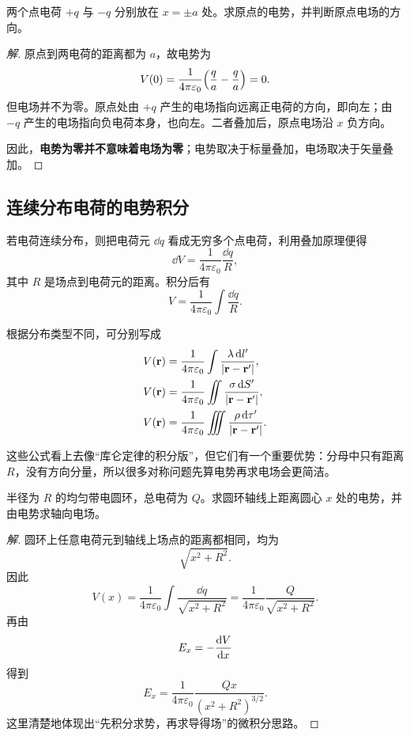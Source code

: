 \begin{example}
两个点电荷 $+q$ 与 $-q$ 分别放在 $x=\pm a$ 处。求原点的电势，并判断原点电场的方向。
\end{example}

\begin{proof}[解]
原点到两电荷的距离都为 $a$，故电势为
\[
V(0)=\frac{1}{4\pi\varepsilon_0}\qty(\frac{q}{a}-\frac{q}{a})=0.
\]
但电场并不为零。原点处由 $+q$ 产生的电场指向远离正电荷的方向，即向左；由 $-q$ 产生的电场指向负电荷本身，也向左。二者叠加后，原点电场沿 $x$ 负方向。

因此，\textbf{电势为零并不意味着电场为零}；电势取决于标量叠加，电场取决于矢量叠加。
\end{proof}

\subsection{连续分布电荷的电势积分}

若电荷连续分布，则把电荷元 $\dd q$ 看成无穷多个点电荷，利用叠加原理便得
\[
\dd V=\frac{1}{4\pi\varepsilon_0}\frac{\dd q}{R},
\]
其中 $R$ 是场点到电荷元的距离。积分后有
\[
V=\frac{1}{4\pi\varepsilon_0}\int \frac{\dd q}{R}.
\]

根据分布类型不同，可分别写成
\begin{align*}
V(\vb r)&=\frac{1}{4\pi\varepsilon_0}\int \frac{\lambda\,\dd l'}{\abs{\vb r-\vb r'}},\\
V(\vb r)&=\frac{1}{4\pi\varepsilon_0}\iint \frac{\sigma\,\dd S'}{\abs{\vb r-\vb r'}},\\
V(\vb r)&=\frac{1}{4\pi\varepsilon_0}\iiint \frac{\rho\,\dd \tau'}{\abs{\vb r-\vb r'}}.
\end{align*}

这些公式看上去像“库仑定律的积分版”，但它们有一个重要优势：分母中只有距离 $R$，没有方向分量，所以很多对称问题先算电势再求电场会更简洁。

\begin{example}
半径为 $R$ 的均匀带电圆环，总电荷为 $Q$。求圆环轴线上距离圆心 $x$ 处的电势，并由电势求轴向电场。
\end{example}

\begin{proof}[解]
圆环上任意电荷元到轴线上场点的距离都相同，均为
\[
\sqrt{x^2+R^2}.
\]
因此
\[
V(x)=\frac{1}{4\pi\varepsilon_0}\int \frac{\dd q}{\sqrt{x^2+R^2}}
=\frac{1}{4\pi\varepsilon_0}\frac{Q}{\sqrt{x^2+R^2}}.
\]
再由
\[
E_x=-\dv{V}{x}
\]
得到
\[
E_x=\frac{1}{4\pi\varepsilon_0}\frac{Qx}{(x^2+R^2)^{3/2}}.
\]
这里清楚地体现出“先积分求势，再求导得场”的微积分思路。
\end{proof}


